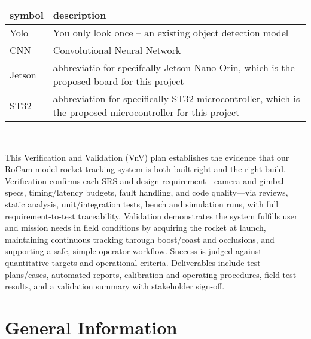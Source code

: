 \documentclass[12pt, titlepage]{article}
\begin{document}
\renewcommand{\arraystretch}{1.2}
\begin{tabular}{l l}
  \toprule
  \textbf{symbol} & \textbf{description}                                             \\
  \midrule
  Yolo            & You only look once -- an existing object detection model         \\
  CNN             & Convolutional Neural Network                                     \\
  Jetson          & abbreviatio for specifcally Jetson Nano Orin, which is the
  proposed board for this project
  \\
  ST32            & abbreviation for specifically ST32 microcontroller, which is the
  proposed microcontroller for this project                                          \\

  \bottomrule
\end{tabular}\\



\newpage


This Verification and Validation (VnV) plan establishes the evidence that our
RoCam model-rocket tracking system is both built right and the right build.
Verification confirms each SRS and design requirement—camera and gimbal specs,
timing/latency budgets, fault handling, and code quality—via reviews, static
analysis, unit/integration tests, bench and simulation runs, with full
requirement-to-test traceability. Validation demonstrates the system fulfills
user and mission needs in field conditions by acquiring the rocket at launch,
maintaining continuous tracking through boost/coast and occlusions, and
supporting a safe, simple operator workflow. Success is judged against
quantitative targets and operational criteria. Deliverables include test
plans/cases, automated reports, calibration and operating procedures,
field-test results, and a validation summary with stakeholder sign-off.


\section{General Information}
\end{document}
